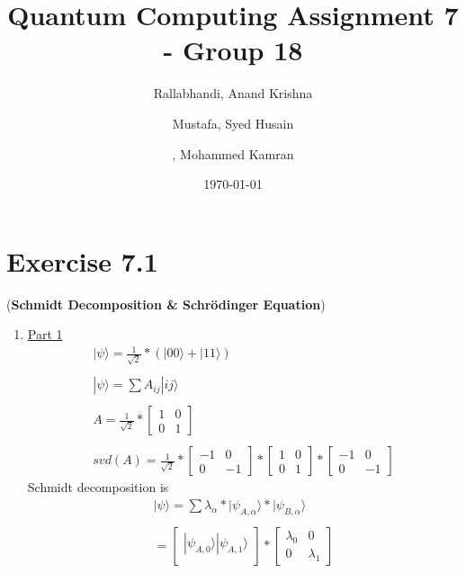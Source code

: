 \documentclass[a4paper,12pt]{article}
\title{Quantum Computing Assignment 7 - Group 18}
\author{
    Rallabhandi, Anand Krishna 
    \and
    Mustafa, Syed Husain
    \and
     , Mohammed Kamran 
}
\date{\today}
\begin{document}
\maketitle

\section*{Exercise 7.1}

 \begin{large}(\textbf{Schmidt Decomposition \& Schr{\"o}dinger Equation})
 \end{large}

\begin{enumerate}[label=(\alph*)]
\item

\underline{Part 1}
\begin{gather*}
     |\psi\rangle = \frac{1}{\sqrt{2}}*(|00\rangle + |11\rangle)\\~\\
     |\psi\rangle = \sum A_{ij}|ij\rangle\\~\\
     A  =  \frac{1}{\sqrt{2}}*  \begin{bmatrix}
1 & 0 \\
0 & 1
\end{bmatrix}\\~\\
svd(A) =\frac{1}{\sqrt{2}}* \begin{bmatrix}
-1 & 0 \\
0 & -1
\end{bmatrix} * \begin{bmatrix}
1 & 0 \\
0 & 1
\end{bmatrix} * \begin{bmatrix}
-1 & 0 \\
0 & -1
\end{bmatrix}
\end{gather*}
Schmidt decomposition is 
\begin{gather*}
    |\psi\rangle = \sum \lambda_\alpha * |\psi_{A,\alpha}\rangle * |\psi_{B,\alpha}\rangle \\~\\
    = \begin{bmatrix}
|\psi_{A,0}\rangle |\psi_{A,1}\rangle \\
\end{bmatrix} * 
\begin{bmatrix}
\lambda_0 & 0 \\
 0 & \lambda_1

\end{bmatrix}
\end{gather*}
\end{enumerate}
\end{document}
